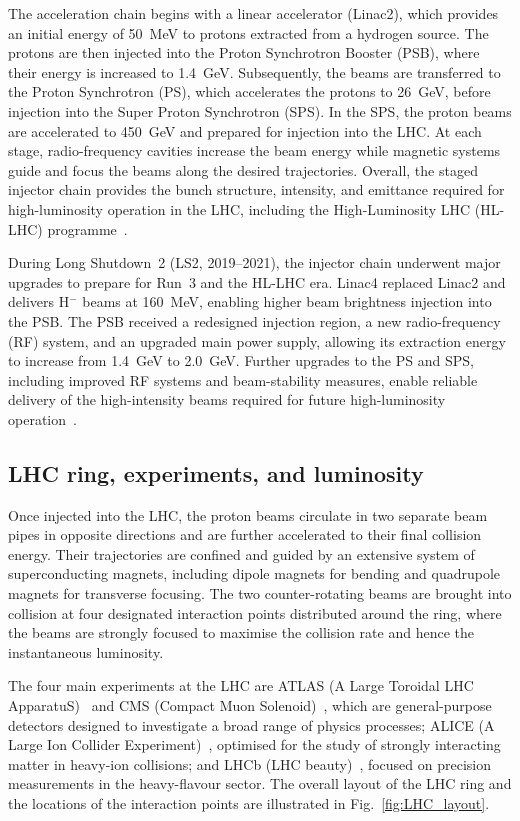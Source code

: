 The acceleration chain begins with a linear accelerator (Linac2), which provides an initial energy of 50~MeV to protons extracted from a hydrogen source. 
The protons are then injected into the Proton Synchrotron Booster (PSB), where their energy is increased to 1.4~GeV. 
Subsequently, the beams are transferred to the Proton Synchrotron (PS), which accelerates the protons to 26~GeV, before injection into the Super Proton Synchrotron (SPS).
In the SPS, the proton beams are accelerated to 450~GeV and prepared for injection into the LHC.
At each stage, radio-frequency cavities increase the beam energy while magnetic systems guide and focus the beams along the desired trajectories.
Overall, the staged injector chain provides the bunch structure, intensity, and emittance required for high-luminosity operation in the LHC, including the High-Luminosity LHC (HL-LHC) programme~\cite{HLLHC2020TDR}.

During Long Shutdown~2 (LS2, 2019--2021), the injector chain underwent major upgrades to prepare for Run~3 and the HL-LHC era.
Linac4 replaced Linac2 and delivers H$^-$ beams at 160~MeV, enabling higher beam brightness injection into the PSB.
The PSB received a redesigned injection region, a new radio-frequency (RF) system, and an upgraded main power supply, allowing its extraction energy to increase from 1.4~GeV to 2.0~GeV.
Further upgrades to the PS and SPS, including improved RF systems and beam-stability measures, enable reliable delivery of the high-intensity beams required for future high-luminosity operation~\cite{HLLHCUpgrade}.

\subsection{LHC ring, experiments, and luminosity}

Once injected into the LHC, the proton beams circulate in two separate beam pipes in opposite directions and are further accelerated to their final collision energy. 
Their trajectories are confined and guided by an extensive system of superconducting magnets, including dipole magnets for bending and quadrupole magnets for transverse focusing. 
The two counter-rotating beams are brought into collision at four designated interaction points distributed around the ring, where the beams are strongly focused to maximise the collision rate and hence the instantaneous luminosity.

The four main experiments at the LHC are ATLAS (A Large Toroidal LHC ApparatuS)~\cite{ATLASTDR14,ATLASTDR15} and CMS (Compact Muon Solenoid)~\cite{CMSPhysicsTDRv1,CMSJPhysG2007}, 
which are general-purpose detectors designed to investigate a broad range of physics processes; 
ALICE (A Large Ion Collider Experiment)~\cite{ALICETP1995}, optimised for the study of strongly interacting matter in heavy-ion collisions; 
and LHCb (LHC beauty)~\cite{LHCbTDR9}, focused on precision measurements in the heavy-flavour sector.
The overall layout of the LHC ring and the locations of the interaction points are illustrated in Fig.~\ref{fig:LHC_layout}.

